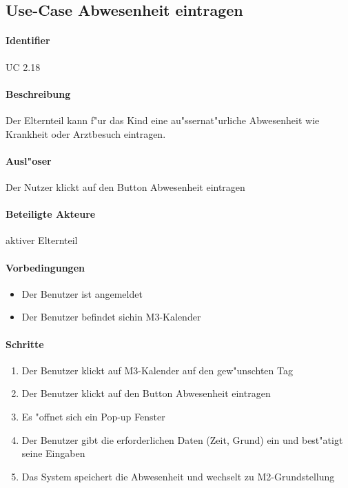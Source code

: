   
  \newpage
 \subsection{Use-Case Abwesenheit eintragen}
  \paragraph{Identifier}
  UC 2.18
  \paragraph{Beschreibung}
  Der Elternteil kann f"ur das Kind eine au"ssernat"urliche Abwesenheit wie Krankheit oder Arztbesuch eintragen.
  \paragraph{Ausl"oser}
  Der Nutzer klickt auf den Button \dq Abwesenheit eintragen\dq
  \paragraph{Beteiligte Akteure}   \leavevmode \newline
    aktiver Elternteil
  \paragraph{Vorbedingungen}
  \begin{itemize}
   \item Der Benutzer ist angemeldet
   \item Der Benutzer befindet sichin M3-Kalender
  \end{itemize}

  \paragraph{Schritte}
  \begin{enumerate}
   \item Der Benutzer klickt auf M3-Kalender auf den gew"unschten Tag
   \item Der Benutzer klickt auf den Button \dq Abwesenheit eintragen\dq
   \item Es "offnet sich ein Pop-up Fenster
   \item Der Benutzer gibt die erforderlichen Daten (Zeit, Grund) ein und best"atigt seine Eingaben
   \item Das System speichert die Abwesenheit und wechselt zu M2-Grundstellung
  \end{enumerate}

